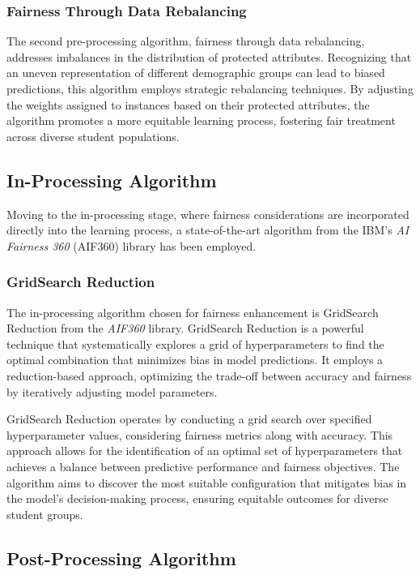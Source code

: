 \documentclass[12pt,a4paper,openright,twoside]{book}
\begin{document}
\subsubsection{Fairness Through Data Rebalancing}

The second pre-processing algorithm, fairness through data rebalancing, addresses imbalances in the distribution of protected attributes. Recognizing that an uneven representation of different demographic groups can lead to biased predictions, this algorithm employs strategic rebalancing techniques. By adjusting the weights assigned to instances based on their protected attributes, the algorithm promotes a more equitable learning process, fostering fair treatment across diverse student populations.

\subsection{In-Processing Algorithm}

Moving to the in-processing stage, where fairness considerations are incorporated directly into the learning process, a state-of-the-art algorithm from the IBM's \emph{AI Fairness 360} (AIF360) library has been employed.

\subsubsection{GridSearch Reduction}

The in-processing algorithm chosen for fairness enhancement is GridSearch Reduction from the \emph{AIF360} library. GridSearch Reduction is a powerful technique that systematically explores a grid of hyperparameters to find the optimal combination that minimizes bias in model predictions. It employs a reduction-based approach, optimizing the trade-off between accuracy and fairness by iteratively adjusting model parameters.

GridSearch Reduction operates by conducting a grid search over specified hyperparameter values, considering fairness metrics along with accuracy. This approach allows for the identification of an optimal set of hyperparameters that achieves a balance between predictive performance and fairness objectives. The algorithm aims to discover the most suitable configuration that mitigates bias in the model's decision-making process, ensuring equitable outcomes for diverse student groups. \cite{agarwal2018reductions}

\subsection{Post-Processing Algorithm}
\end{document}
